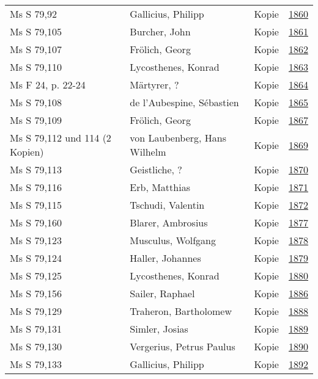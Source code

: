 \documentclass[10pt,a4paper,landscape]{report}
\begin{document}
\begin{longtable}{p{16cm}p{4cm}lr}
Ms S 79,92	&	Gallicius, Philipp	&	Kopie	&	\href{http://130.60.24.72/assignment/1860}{1860}\\
Ms S 79,105	&	Burcher, John	&	Kopie	&	\href{http://130.60.24.72/assignment/1861}{1861}\\
Ms S 79,107	&	Frölich, Georg	&	Kopie	&	\href{http://130.60.24.72/assignment/1862}{1862}\\
Ms S 79,110	&	Lycosthenes, Konrad	&	Kopie	&	\href{http://130.60.24.72/assignment/1863}{1863}\\
Ms F 24, p. 22-24	&	Märtyrer, ?	&	Kopie	&	\href{http://130.60.24.72/assignment/1864}{1864}\\
Ms S 79,108	&	de l'Aubespine, Sébastien	&	Kopie	&	\href{http://130.60.24.72/assignment/1865}{1865}\\
Ms S 79,109	&	Frölich, Georg	&	Kopie	&	\href{http://130.60.24.72/assignment/1867}{1867}\\
Ms S 79,112 und 114 (2 Kopien)	&	von Laubenberg, Hans Wilhelm	&	Kopie	&	\href{http://130.60.24.72/assignment/1869}{1869}\\
Ms S 79,113	&	Geistliche, ?	&	Kopie	&	\href{http://130.60.24.72/assignment/1870}{1870}\\
Ms S 79,116	&	Erb, Matthias	&	Kopie	&	\href{http://130.60.24.72/assignment/1871}{1871}\\
Ms S 79,115	&	Tschudi, Valentin	&	Kopie	&	\href{http://130.60.24.72/assignment/1872}{1872}\\
Ms S 79,160	&	Blarer, Ambrosius	&	Kopie	&	\href{http://130.60.24.72/assignment/1877}{1877}\\
Ms S 79,123	&	Musculus, Wolfgang	&	Kopie	&	\href{http://130.60.24.72/assignment/1878}{1878}\\
Ms S 79,124	&	Haller, Johannes	&	Kopie	&	\href{http://130.60.24.72/assignment/1879}{1879}\\
Ms S 79,125	&	Lycosthenes, Konrad	&	Kopie	&	\href{http://130.60.24.72/assignment/1880}{1880}\\
Ms S 79,156	&	Sailer, Raphael	&	Kopie	&	\href{http://130.60.24.72/assignment/1886}{1886}\\
Ms S 79,129	&	Traheron, Bartholomew	&	Kopie	&	\href{http://130.60.24.72/assignment/1888}{1888}\\
Ms S 79,131	&	Simler, Josias	&	Kopie	&	\href{http://130.60.24.72/assignment/1889}{1889}\\
Ms S 79,130	&	Vergerius, Petrus Paulus	&	Kopie	&	\href{http://130.60.24.72/assignment/1890}{1890}\\
Ms S 79,133	&	Gallicius, Philipp	&	Kopie	&	\href{http://130.60.24.72/assignment/1892}{1892}\\

\end{longtable}
\end{document}
